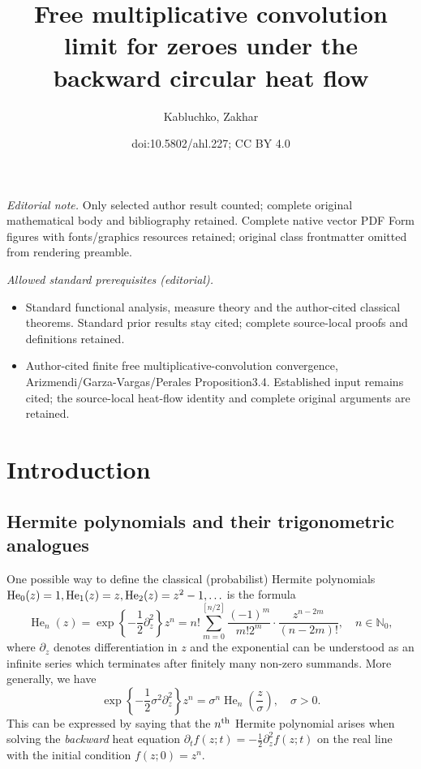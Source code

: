 \documentclass[10pt]{amsart}
\title{Free multiplicative convolution limit for zeroes under the backward circular heat flow}
\author{Kabluchko, Zakhar}
\date{doi:10.5802/ahl.227; CC BY 4.0}
\theoremstyle{definition}\newtheorem{defi}[theo]{Definition}\newtheorem{rema}[theo]{Remark}\newtheorem{exam}[theo]{Example}\newtheorem{exem}[theo]{Example}\newtheorem{nota}[theo]{Notation}
\DeclareMathOperator*{\He}{He}
\newcommand{\N}{\mathbb{N}}
\begin{document}
\maketitle
\noindent\textit{Editorial note.} Only selected author result counted; complete original mathematical body and bibliography retained. Complete native vector PDF Form figures with fonts/graphics resources retained; original class frontmatter omitted from rendering preamble.\par\medskip
\noindent\textit{Allowed standard prerequisites (editorial).}\begin{itemize}
\item Standard functional analysis, measure theory and the author-cited classical theorems. Standard prior results stay cited; complete source-local proofs and definitions retained.
\item Author-cited finite free multiplicative-convolution convergence, Arizmendi/Garza-Vargas/Perales Proposition3.4. Established input remains cited; the source-local heat-flow identity and complete original arguments are retained.
\end{itemize}\medskip

\section{Introduction}
\subsection{Hermite polynomials and their trigonometric analogues}

One possible way to define the classical (probabilist) Hermite polynomials $\He_0(z)\linebreak = 1, \He_1(z) = z, \He_2(z)=z^2-1,\ldots$ is the formula
\begin{equation}\label{eq:hermite_poly_def}
\He\nolimits_n(z) =
\exp\left\{-\frac 1 2 \partial_z^2\right\} z^n = n! \sum_{m=0}^{[n/2]} \frac{(-1)^m }{m! 2^m} \cdot \frac{z^{n-2m}}{(n-2m)!},
\quad n\in \N_0,
\end{equation}
where $\partial_z$ denotes differentiation in $z$ and the exponential can be understood as an infinite series which terminates after finitely many non-zero summands. More generally, we have
\begin{equation}\label{eq:eq:hermite_exp_on_z^n_with_sigma}
\exp\left\{-\frac{1}{2}\sigma^2 \partial_z^2\right\} z^n = \sigma^n \He\nolimits_n\left(\frac{z}{\sigma}\right), \quad \sigma >0.
\end{equation}
This can be expressed by saying that the $n^{\text{\normalfont th}}$ Hermite polynomial arises when solving the \emph{backward} heat equation $\partial_t f(z; t) = -\frac 12 \partial^2_z f(z;t)$ on the real line with the initial condition $f(z;0) = z^n$.
\end{document}
